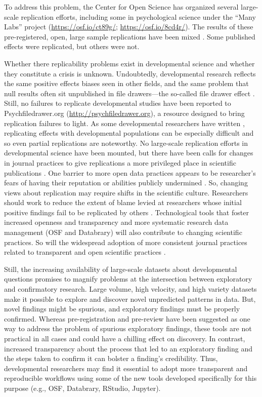\documentclass[letterpaper,man,apacite,natbib]{apa6}
\begin{document}
To address this problem, the Center for Open Science has organized several large-scale replication efforts, including some in psychological science under the ``Many Labs'' project (\url{https://osf.io/ct89g/}; \url{https://osf.io/8cd4r/}).
The results of these pre-registered, open, large sample replications have been mixed \cite{collaboration_estimating_2015}.
Some published effects were replicated, but others were not.

Whether there replicability problems exist in developmental science and whether they constitute a crisis is unknown.
Undoubtedly, developmental research reflects the same positive effects biases seen in other fields, and the same problem that null results often sit unpublished in file drawers---the so-called file drawer effect \cite{rosenthal_file_1979}.
Still, no failures to replicate developmental studies have been reported to Psychfiledrawer.org (\url{http://psychfiledrawer.org}), a resource designed to bring replication failures to light.
As some developmental researchers have written \cite{bishop-blog-2012}, replicating effects with developmental populations can be especially difficult and so even partial replications are noteworthy.
No large-scale replication efforts in developmental science have been mounted, but there have been calls for changes in journal practices to give replications a more privileged place in scientific publications \cite{bishop-blog-2012}.
One barrier to more open data practices appears to be researcher's fears of having their reputation or abilities publicly undermined \cite{ascoli_ups_2006}.
So, changing views about replication may require shifts in the scientific culture.
Researchers should work to reduce the extent of blame levied at researchers whose initial positive findings fail to be replicated by others \cite{bishop-blog-2015}.
Technological tools that foster increased openness and transparency and more systematic research data management (OSF and Databrary) will also contribute to changing scientific practices.
So will the widespread adoption of more consistent journal practices related to transparent and open scientific practices \cite{nosek_promoting_2015}.

Still, the increasing availability of large-scale datasets about developmental questions promises to magnify problems at the intersection between exploratory and confirmatory research.
Large volume, high velocity, and high variety datasets make it possible to explore and discover novel unpredicted patterns in data.
But, novel findings might be spurious, and exploratory findings must be properly confirmed.
Whereas pre-registration and pre-review have been suggested as one way to address the problem of spurious exploratory findings, these tools are not practical in all cases and could have a chilling effect on discovery.
In contrast, increased transparency about the process that led to an exploratory finding and the steps taken to confirm it can bolster a finding's credibility.
Thus, developmental researchers may find it essential to adopt more transparent and reproducible workflows using some of the new tools developed specifically for this purpose (e.g., OSF, Databrary, RStudio, Jupyter).
\end{document}

